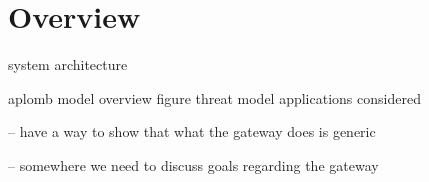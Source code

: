\section{Overview}\label{sec:overview}

system architecture 

aplomb model
overview figure
threat model
applications considered

   -- have a way to show that what the gateway does is generic 
   
   -- somewhere we need to discuss goals regarding the gateway
